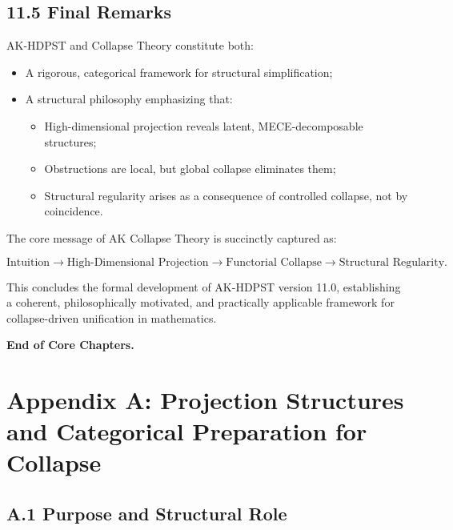 \documentclass[11pt]{article}
\begin{document}
\subsection*{11.5 Final Remarks}

AK-HDPST and Collapse Theory constitute both:

\begin{itemize}
    \item A rigorous, categorical framework for structural simplification;
    \item A structural philosophy emphasizing that:
    \begin{itemize}
        \item High-dimensional projection reveals latent, MECE-decomposable structures;
        \item Obstructions are local, but global collapse eliminates them;
        \item Structural regularity arises as a consequence of controlled collapse, not by coincidence.
    \end{itemize}
\end{itemize}

The core message of AK Collapse Theory is succinctly captured as:

\[
\text{Intuition} \longrightarrow \text{High-Dimensional Projection} \longrightarrow \text{Functorial Collapse} \longrightarrow \text{Structural Regularity}.
\]

This concludes the formal development of AK-HDPST version 11.0, establishing a coherent, philosophically motivated, and practically applicable framework for collapse-driven unification in mathematics.

\vspace{1em}
\noindent\textbf{End of Core Chapters.}



\appendix
\section*{Appendix A: Projection Structures and Categorical Preparation for Collapse}

\subsection*{A.1 Purpose and Structural Role}
\end{document}

